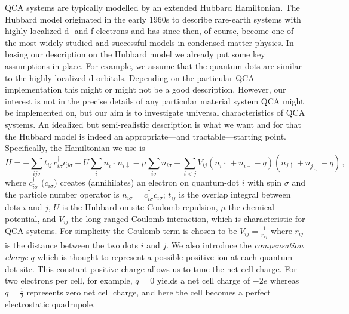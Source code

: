 QCA systems are typically modelled by an extended Hubbard Hamiltonian. The
Hubbard model originated in the early 1960s to describe rare-earth systems with
highly localized d- and f-electrons and has since then, of course, become one of
the most widely studied and successful models in condensed matter physics. In
basing our description on the Hubbard model we already put some key assumptions
in place. For example, we assume that the quantum dots are similar to the highly
localized d-orbitals. Depending on the particular QCA implementation this might
or might not be a good description. However, our interest is not in the precise
details of any particular material system QCA might be implemented on, but our
aim is to investigate universal characteristics of QCA systems. An idealized but
semi-realistic description is what we want and for that the Hubbard model is
indeed an appropriate---and tractable---starting point. Specifically, the
Hamiltonian we use is
\begin{equation}
  \label{eq:H_QCA}
  H =
    - \sum_{ij\sigma} t_{ij} \, c^{\dagger}_{i\sigma} c_{j\sigma}
    + U \sum_i n_{i\uparrow} n_{i\downarrow}
    - \mu \sum_{i\sigma} n_{i\sigma}
    + \sum_{i<j} V_{ij} \left( n_{i\uparrow} + n_{i\downarrow} - q \right) 
                        \left( n_{j\uparrow} + n_{j\downarrow} - q \right) \, ,
\end{equation}
where $c^{\dagger}_{i\sigma}$ ($c_{i\sigma}$) creates (annihilates) an electron
on quantum-dot $i$ with spin $\sigma$ and the particle number operator is
$n_{i\sigma} = c^{\dagger}_{i\sigma} c_{i\sigma}$; $t_{ij}$ is the overlap integral between
dots $i$ and $j$, $U$ is the Hubbard on-site Coulomb repulsion, $\mu$ the
chemical potential, and $V_{ij}$ the long-ranged Coulomb interaction, which is
characteristic for QCA systems. For simplicity the Coulomb term is chosen to be
$V_{ij} = \frac{1}{r_{ij}}$ where $r_{ij}$ is the distance between the two dots
$i$ and $j$. We also introduce the \emph{compensation charge} $q$ which is
thought to represent a possible positive ion at each quantum dot site. This
constant positive charge allows us to tune the net cell charge. For two
electrons per cell, for example, $q=0$ yields a net cell charge of $-2e$ whereas
$q = \frac{1}{2}$ represents zero net cell charge, and here the cell becomes a
perfect electrostatic quadrupole.

